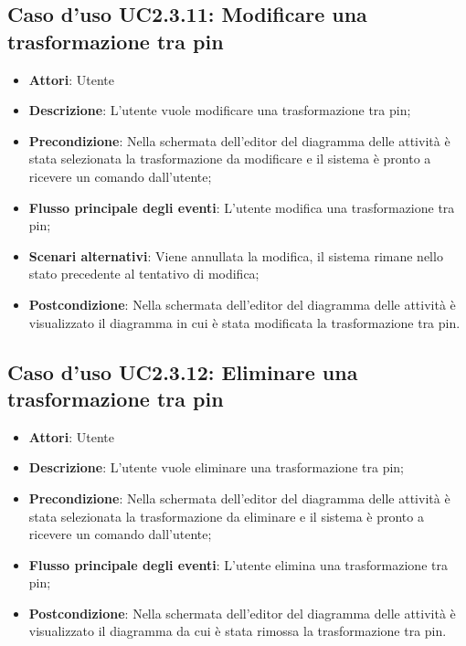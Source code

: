 \documentclass[../AnalisiDeiRequisiti.tex]{subfiles}
\begin{document}
					\subsection{Caso d'uso UC2.3.11: Modificare una trasformazione tra pin}
					\begin{itemize}
						\item \textbf{Attori}: Utente
						\item \textbf{Descrizione}: L'utente vuole modificare una trasformazione tra pin;
						\item \textbf{Precondizione}: Nella schermata dell'editor del diagramma delle attività è stata selezionata la trasformazione da modificare e il sistema è pronto a ricevere un comando dall'utente;
						\item \textbf{Flusso principale degli eventi}: L'utente modifica una trasformazione tra pin;
						\item \textbf{Scenari alternativi}: Viene annullata la modifica, il sistema rimane nello stato precedente al tentativo di modifica;
						\item \textbf{Postcondizione}: Nella schermata dell'editor del diagramma delle attività è visualizzato il diagramma in cui è stata modificata la trasformazione tra pin.
					\end{itemize}
					\subsection{Caso d'uso UC2.3.12: Eliminare una trasformazione tra pin}
					\begin{itemize}
						\item \textbf{Attori}: Utente
						\item \textbf{Descrizione}: L'utente vuole eliminare una trasformazione tra pin;
						\item \textbf{Precondizione}: Nella schermata dell'editor del diagramma delle attività è stata selezionata la trasformazione da eliminare e il sistema è pronto a ricevere un comando dall'utente;
						\item \textbf{Flusso principale degli eventi}: L'utente elimina una trasformazione tra pin;
						\item \textbf{Postcondizione}: Nella schermata dell'editor del diagramma delle attività è visualizzato il diagramma da cui è stata rimossa la trasformazione tra pin.
					\end{itemize}
\end{document}
